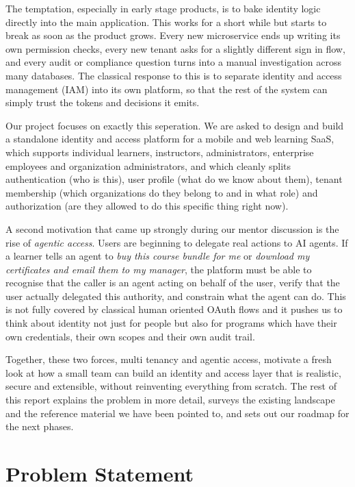 \documentclass[11pt,a4paper]{article}
\begin{document}
The temptation, especially in early stage products, is to bake identity logic directly into the main application. This works for a short while but starts to break as soon as the product grows. Every new microservice ends up writing its own permission checks, every new tenant asks for a slightly different sign in flow, and every audit or compliance question turns into a manual investigation across many databases. The classical response to this is to separate identity and access management (IAM) into its own platform, so that the rest of the system can simply trust the tokens and decisions it emits.

Our project focuses on exactly this seperation. We are asked to design and build a standalone identity and access platform for a mobile and web learning SaaS, which supports individual learners, instructors, administrators, enterprise employees and organization administrators, and which cleanly splits authentication (who is this), user profile (what do we know about them), tenant membership (which organizations do they belong to and in what role) and authorization (are they allowed to do this specific thing right now).

A second motivation that came up strongly during our mentor discussion is the rise of \textit{agentic access}. Users are beginning to delegate real actions to AI agents. If a learner tells an agent to \textit{buy this course bundle for me} or \textit{download my certificates and email them to my manager}, the platform must be able to recognise that the caller is an agent acting on behalf of the user, verify that the user actually delegated this authority, and constrain what the agent can do. This is not fully covered by classical human oriented OAuth flows and it pushes us to think about identity not just for people but also for programs which have their own credentials, their own scopes and their own audit trail.

Together, these two forces, multi tenancy and agentic access, motivate a fresh look at how a small team can build an identity and access layer that is realistic, secure and extensible, without reinventing everything from scratch. The rest of this report explains the problem in more detail, surveys the existing landscape and the reference material we have been pointed to, and sets out our roadmap for the next phases.

\section{Problem Statement}
\end{document}
